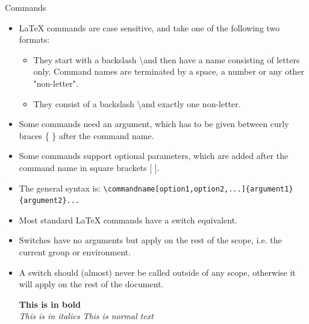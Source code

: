 \documentclass[style=lsuloni,orient=landscape]{powerdot}
\begin{document}
\begin{wideslide}[bm={Commands},method=direct]{Commands}
  \begin{itemize}
  \item LaTeX commands are case sensitive, and take one of the following two formats:
    \begin{itemize}
    \item They start with a backslash \textbackslash and then have a name consisting of letters only. Command names are terminated by a space, a number or any other "non-letter".
    \item They consist of a backslash \textbackslash and exactly one non-letter.
    \end{itemize}
  \item Some commands need an argument, which has to be given between curly braces \{ \} after the command name. 
  \item Some commands support optional parameters, which are added after the command name in square brackets [ ]. 
  \item The general syntax is:
    \lstinline|\commandname[option1,option2,...]{argument1}{argument2}...|
  \item Most standard LaTeX commands have a switch equivalent. 
  \item Switches have no arguments but apply on the rest of the scope, i.e. the current group or environment. 
  \item A switch should (almost) never be called outside of any scope, otherwise it will apply on the rest of the document.
    \begin{LTXexample}[numbers=none,pos=r]
{\bf This is in bold}\\
\em This is in italics
This is normal text
  \end{LTXexample}
  \end{itemize}	
\end{wideslide}
\end{document}
